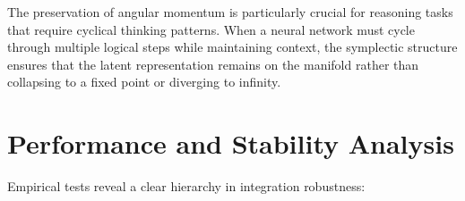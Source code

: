 \documentclass[12pt,a4paper]{article}
\begin{document}
The preservation of angular momentum is particularly crucial for reasoning tasks that require cyclical thinking patterns. When a neural network must cycle through multiple logical steps while maintaining context, the symplectic structure ensures that the latent representation remains on the manifold rather than collapsing to a fixed point or diverging to infinity.

\section{Performance and Stability Analysis}

Empirical tests reveal a clear hierarchy in integration robustness:
\end{document}
